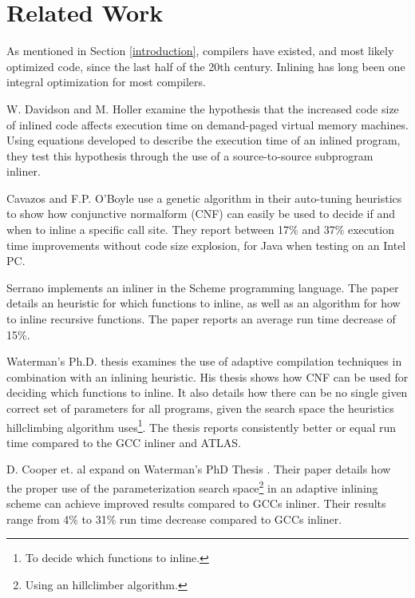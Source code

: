 
\clearpage
\section{Related Work}

As mentioned in Section \ref{introduction}, compilers have existed, and most
likely optimized code, since the last half of the 20th century. Inlining has
long been one integral optimization for most compilers.

W. Davidson and M. Holler \cite{SubprogInlining} examine the hypothesis that the
increased code size of inlined code affects execution time on demand-paged
virtual memory machines. Using equations developed to describe the execution
time of an inlined program, they test this hypothesis through the use of a
source-to-source subprogram inliner.

Cavazos and F.P. O'Boyle \cite{AutoTuningJavaHeuristics} use a genetic algorithm
in their auto-tuning heuristics to show how conjunctive normalform (CNF) can
easily be used to decide if and when to inline a specific call site. They report
between 17\% and 37\% execution time improvements without code size explosion,
for Java when testing on an Intel PC.

Serrano \cite{InlineWhenHowSerrano} implements an inliner in the Scheme
programming language. The paper details an heuristic for which functions to
inline, as well as an algorithm for how to inline recursive functions. The paper
reports an average run time decrease of 15\%.


Waterman's Ph.D. thesis \cite{AdaptvCompilAndInlingWaterman} examines the use of
adaptive compilation techniques in combination with an inlining heuristic. His
thesis shows how CNF can be used for deciding which functions to inline. It also
details how there can be no single given correct set of parameters for all
programs, given the search space the heuristics hillclimbing algorithm
uses\footnote{To decide which functions to inline.}. The thesis reports
consistently better or equal run time compared to the GCC inliner and ATLAS.

D. Cooper et. al \cite{AdaptvStratInlSubst} expand on Waterman's PhD Thesis
\cite{AdaptvCompilAndInlingWaterman}. Their paper details how the proper use of
the parameterization search space\footnote{Using an hillclimber algorithm.} in
an adaptive inlining scheme can achieve improved results compared to GCCs
inliner. Their results range from 4\% to 31\% run time decrease compared to GCCs
inliner.

